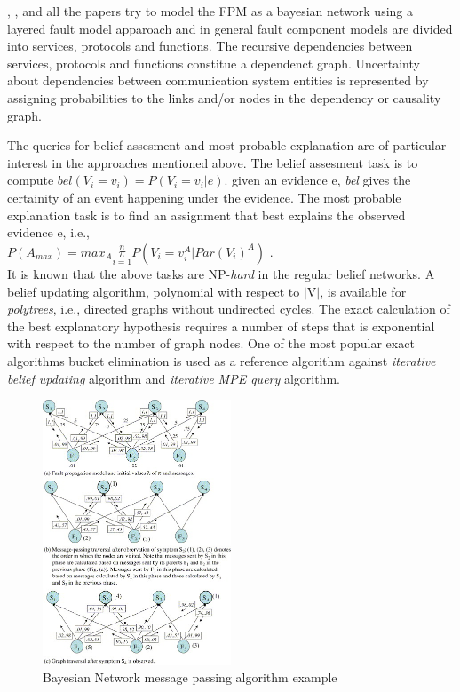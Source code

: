 \documentclass[10pt]{sigplan-proc-varsize}
\begin{document}
\cite{Cynthia:97}, \cite{Sethi:02}, \cite{Sethi:041} and \cite{Sethi:04} all the papers try to model the FPM as a bayesian network using a layered fault model apparoach and in general fault component models are divided into services, protocols and functions. The recursive dependencies between services, protocols and functions constitue a dependenct graph. Uncertainty about dependencies between communication system entities is represented by assigning probabilities to the links and/or nodes in the dependency or causality graph. 

The queries for belief assesment and most probable explanation are of particular interest in the approaches mentioned above. The belief assesment task is to compute $bel(V_i=v_i) = P(V_i=v_i|e)$. given an evidence e, {\it bel}  gives the certainity of an event happening under the evidence. The most probable explanation task is to find an assignment that best explains the observed evidence e, i.e.,  \\
$P(A_{max}) = max_A \underset{i=1}{\overset{n}{\pi}} P(V_i=v_i^A | Par(V_i)^A)$ \cite{Pearl:98}. \\
It is known that the above tasks are NP-{\it hard} in the regular belief networks. A belief updating algorithm, polynomial with respect to $|$V$|$, is available for {\it polytrees}, i.e., directed graphs without undirected cycles. The exact calculation of the best explanatory hypothesis requires a number of steps that is exponential with respect to the number of graph nodes. One of the most popular exact algorithms bucket elimination is used as a reference algorithm against {\it iterative belief updating} algorithm and {\it iterative MPE query} algorithm.

\begin{figure}[h!]
  \caption{Bayesian Network message passing algorithm example}
  \centering
    \includegraphics[width=0.5\textwidth]{Fig7}
\end{figure}
\end{document}
